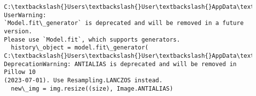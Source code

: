 \documentclass[11pt]{article}
\begin{document}
    \begin{Verbatim}[commandchars=\\\{\}]
C:\textbackslash{}Users\textbackslash{}User\textbackslash{}AppData\textbackslash{}Local\textbackslash{}Temp\textbackslash{}ipykernel\_46608\textbackslash{}3366608101.py:16: UserWarning:
`Model.fit\_generator` is deprecated and will be removed in a future version.
Please use `Model.fit`, which supports generators.
  history\_object = model.fit\_generator(
C:\textbackslash{}Users\textbackslash{}User\textbackslash{}AppData\textbackslash{}Local\textbackslash{}Temp\textbackslash{}ipykernel\_46608\textbackslash{}3032259505.py:16:
DeprecationWarning: ANTIALIAS is deprecated and will be removed in Pillow 10
(2023-07-01). Use Resampling.LANCZOS instead.
  new\_img = img.resize((size), Image.ANTIALIAS)
    \end{Verbatim}
\end{document}
